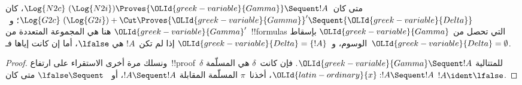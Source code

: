 \documentclass[../../../include/open-logic-section]{subfiles}
\begin{document}


\begin{prop}
متى كان~$\Log{N2c}\ (\Log{N2i}) \Proves {\OLId{greek-variable}{Gamma}} \Sequent !A$، كان
$\Log{G2c}\ (\Log{G2i}) + \Cut \Proves {\OLId{greek-variable}{Gamma}}' \Sequent {\OLId{greek-variable}{Delta}}$؛
و~${\OLId{greek-variable}{Gamma}}'$ هنا هي المجموعة المتعددة من~!!{formula}s التي تحصل من
${\OLId{greek-variable}{Gamma}}$ بإسقاط الوسوم، و~${\OLId{greek-variable}{Delta}} = \{!A\}$ إذا لم تكن~$!A$ هي
$\lfalse$، أما إن كانت إياها فـ~${\OLId{greek-variable}{Delta}} = \emptyset$.
\end{prop}

\begin{proof}
ونسلك مرة أخرى الاستقراء على ارتفاع~!!{proof}~$\delta$ للمتتالية
${\OLId{greek-variable}{Gamma}} \Sequent !A$. فإن كانت~$\delta$ هي المسلّمة
${\OLId{latin-ordinary}{x}}:!A \Sequent !A$، أخذنا~$\pi$ المسلّمة المقابلة
$!A \Sequent !A$، أو~$\lfalse \Sequent \ $ متى كان
$!A \ident \lfalse$.


\end{proof}
\end{document}
